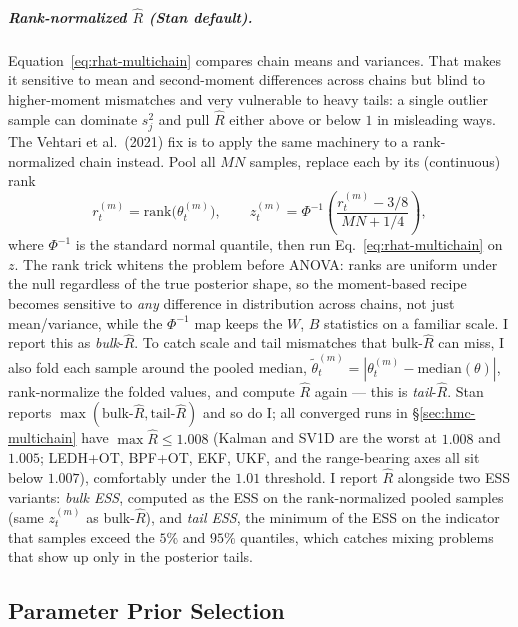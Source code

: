 \documentclass{article}
\begin{document}
\subparagraph{Rank-normalized $\hat R$ (Stan default).}
Equation~\ref{eq:rhat-multichain} compares chain means and variances. That makes it sensitive to mean and second-moment differences across chains but blind to higher-moment mismatches and very vulnerable to heavy tails: a single outlier sample can dominate $s_j^2$ and pull $\hat R$ either above or below $1$ in misleading ways. The Vehtari et al.\ (2021) fix is to apply the same machinery to a rank-normalized chain instead. Pool all $MN$ samples, replace each by its (continuous) rank
\[
r_t^{(m)} = \mathrm{rank}\bigl(\theta_t^{(m)}\bigr), \qquad z_t^{(m)} = \Phi^{-1}\!\left(\frac{r_t^{(m)} - 3/8}{MN + 1/4}\right),
\]
where $\Phi^{-1}$ is the standard normal quantile, then run Eq.~\ref{eq:rhat-multichain} on $z$. The rank trick whitens the problem before ANOVA: ranks are uniform under the null regardless of the true posterior shape, so the moment-based recipe becomes sensitive to \emph{any} difference in distribution across chains, not just mean/variance, while the $\Phi^{-1}$ map keeps the $W$, $B$ statistics on a familiar scale. I report this as \emph{bulk}-$\hat R$. To catch scale and tail mismatches that bulk-$\hat R$ can miss, I also fold each sample around the pooled median, $\tilde\theta_t^{(m)} = |\theta_t^{(m)} - \mathrm{median}(\theta)|$, rank-normalize the folded values, and compute $\hat R$ again --- this is \emph{tail}-$\hat R$. Stan reports $\max(\mathrm{bulk}\text{-}\hat R, \mathrm{tail}\text{-}\hat R)$ and so do I; all converged runs in \S\ref{sec:hmc-multichain} have $\max\hat R \le 1.008$ (Kalman and SV1D are the worst at $1.008$ and $1.005$; LEDH+OT, BPF+OT, EKF, UKF, and the range-bearing axes all sit below $1.007$), comfortably under the $1.01$ threshold. I report $\hat R$ alongside two ESS variants: \emph{bulk ESS}, computed as the ESS on the rank-normalized pooled samples (same $z_t^{(m)}$ as bulk-$\hat R$), and \emph{tail ESS}, the minimum of the ESS on the indicator that samples exceed the $5\%$ and $95\%$ quantiles, which catches mixing problems that show up only in the posterior tails.

\subsection{Parameter Prior Selection}
\label{sec:param-prior-selection}
\end{document}
